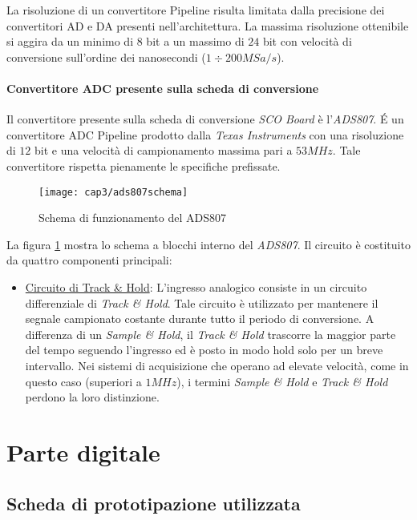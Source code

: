 La risoluzione di un convertitore Pipeline risulta limitata dalla precisione dei convertitori AD e DA presenti nell'architettura. La massima risoluzione ottenibile si aggira da un minimo di $8$ bit a un massimo di $24$ bit  con velocità di conversione sull'ordine dei nanosecondi ($1 \div 200 MSa/s$). 

\paragraph{Convertitore ADC presente sulla scheda di conversione}
Il convertitore presente sulla scheda di conversione \textit{SCO Board} è l'\textit{ADS807}. \'E un convertitore ADC Pipeline prodotto dalla \textit{Texas Instruments} con una risoluzione di $12$ bit e una velocità di campionamento massima pari a $53MHz$. Tale convertitore rispetta pienamente le specifiche prefissate.

\begin{figure}  
  \begin{center}
    \texttt{[image: cap3/ads807schema]}
    \caption{Schema di funzionamento del ADS807}
    \label{ads807schema}
  \end{center}
\end{figure}

La figura \ref{ads807schema} mostra lo schema a blocchi interno del \textit{ADS807}.
Il circuito è costituito da quattro componenti principali:
\begin{itemize}
	\item \underline{Circuito di Track \& Hold}: L'ingresso analogico consiste in un circuito differenziale di \textit{Track \& Hold}. Tale circuito è utilizzato per mantenere il segnale campionato costante durante tutto il periodo di conversione. A differenza di un \textit{Sample \& Hold}, il \textit{Track \& Hold} trascorre la maggior parte del tempo seguendo l'ingresso ed è posto in modo hold solo per un breve intervallo. Nei sistemi di acquisizione che operano ad elevate velocità, come in questo caso (superiori a $1MHz$), i termini \textit{Sample \& Hold} e \textit{Track \& Hold} perdono la loro distinzione. 
\end{itemize}


\section{Parte digitale}

\subsection{Scheda di prototipazione utilizzata}


